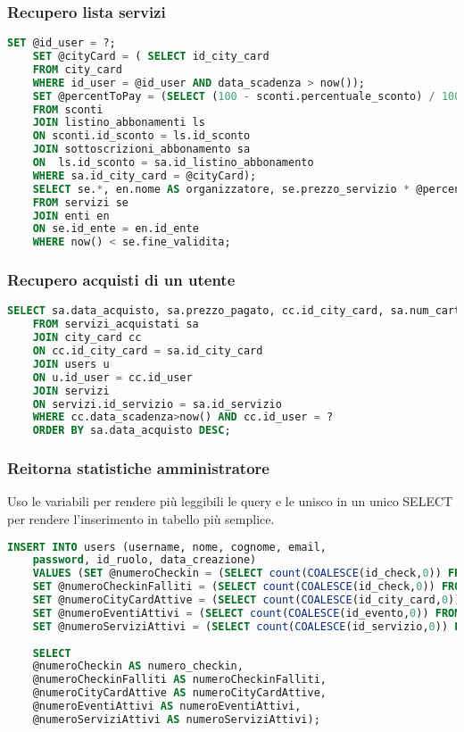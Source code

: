 \subsubsection{Recupero lista servizi}
\begin{lstlisting}[language=SQL]
	SET @id_user = ?;     
	SET @cityCard = ( SELECT id_city_card
	FROM city_card
	WHERE id_user = @id_user AND data_scadenza > now());
	SET @percentToPay = (SELECT (100 - sconti.percentuale_sconto) / 100
	FROM sconti 
	JOIN listino_abbonamenti ls 
	ON sconti.id_sconto = ls.id_sconto
	JOIN sottoscrizioni_abbonamento sa
	ON  ls.id_sconto = sa.id_listino_abbonamento
	WHERE sa.id_city_card = @cityCard);
	SELECT se.*, en.nome AS organizzatore, se.prezzo_servizio * @percentToPay AS prezzo_scontato
	FROM servizi se
	JOIN enti en
	ON se.id_ente = en.id_ente
	WHERE now() < se.fine_validita;
\end{lstlisting}

\subsubsection{Recupero acquisti di un utente}
\begin{lstlisting}[language=SQL]
	SELECT sa.data_acquisto, sa.prezzo_pagato, cc.id_city_card, sa.num_carta_credito, servizi.descrizione_servizio AS nome_servizio, u.id_user, sa.id_servizio
	FROM servizi_acquistati sa
	JOIN city_card cc
	ON cc.id_city_card = sa.id_city_card
	JOIN users u
	ON u.id_user = cc.id_user
	JOIN servizi
	ON servizi.id_servizio = sa.id_servizio
	WHERE cc.data_scadenza>now() AND cc.id_user = ?
	ORDER BY sa.data_acquisto DESC;
\end{lstlisting}



\subsubsection{Reitorna statistiche amministratore}
Uso le variabili per rendere più leggibili le query e le unisco in un unico SELECT per rendere l'inserimento in tabello più semplice. 
\begin{lstlisting}[language=SQL]
	INSERT INTO users (username, nome, cognome, email,
	password, id_ruolo, data_creazione) 
	VALUES (SET @numeroCheckin = (SELECT count(COALESCE(id_check,0)) FROM checks);
	SET @numeroCheckinFalliti = (SELECT count(COALESCE(id_check,0)) FROM checks WHERE id_check != 1);
	SET @numeroCityCardAttive = (SELECT count(COALESCE(id_city_card,0)) FROM city_card WHERE data_scadenza > now());
	SET @numeroEventiAttivi = (SELECT count(COALESCE(id_evento,0)) FROM eventi WHERE fine_validita > now());
	SET @numeroServiziAttivi = (SELECT count(COALESCE(id_servizio,0)) FROM servizi WHERE fine_validita > now());
	
	SELECT 
	@numeroCheckin AS numero_checkin,
	@numeroCheckinFalliti AS numeroCheckinFalliti,
	@numeroCityCardAttive AS numeroCityCardAttive,
	@numeroEventiAttivi AS numeroEventiAttivi,
	@numeroServiziAttivi AS numeroServiziAttivi);
\end{lstlisting}





